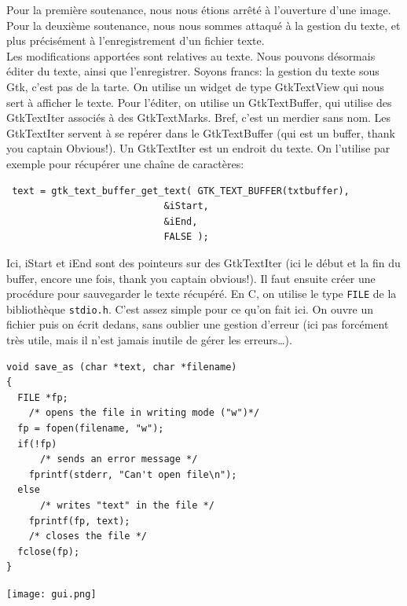 \documentclass[a4paper,12pt]{report}
\begin{document}
Pour la premi\`ere soutenance, nous nous \'etions arr\^et\'e \`a l'ouverture d'une image.\\
Pour la deuxi\`eme soutenance, nous nous sommes attaqu\'e \`a la gestion du texte, et plus pr\'ecis\'ement \`a l'enregistrement d'un fichier texte.\\
Les modifications apport\'ees sont relatives au texte. Nous pouvons d\'esormais \'editer du texte, ainsi que l'enregistrer. Soyons francs: la gestion du texte sous Gtk, c'est pas de la tarte. On utilise un widget de type GtkTextView qui nous sert \`a afficher le texte. Pour l'\'editer, on utilise un GtkTextBuffer, qui utilise des GtkTextIter associ\'es \`a des GtkTextMarks. Bref, c'est un merdier sans nom.
Les GtkTextIter servent \`a se rep\'erer dans le GtkTextBuffer (qui est un buffer, thank you captain Obvious!). Un GtkTextIter est un endroit du texte. On l'utilise par exemple pour r\'ecup\'erer une cha\^ine de caract\`eres:
\begin{lstlisting}
 text = gtk_text_buffer_get_text( GTK_TEXT_BUFFER(txtbuffer),
                            &iStart,
                            &iEnd,
                            FALSE );
\end{lstlisting}
Ici, iStart et iEnd sont des pointeurs sur des GtkTextIter (ici le d\'ebut et la fin du buffer, encore une fois, thank you captain obvious!).
Il faut ensuite cr\'eer une proc\'edure pour sauvegarder le texte r\'ecup\'er\'e. En C, on utilise le type \verb!FILE! de la biblioth\`eque \verb!stdio.h!. C'est assez simple pour ce qu'on fait ici. On ouvre un fichier puis on \'ecrit dedans, sans oublier une gestion d'erreur (ici pas forc\'ement tr\`es utile, mais il n'est jamais inutile de g\'erer les erreurs\ldots).

\begin{lstlisting}
void save_as (char *text, char *filename)
{
  FILE *fp;
    /* opens the file in writing mode ("w")*/
  fp = fopen(filename, "w");
  if(!fp)
      /* sends an error message */
    fprintf(stderr, "Can't open file\n");
  else
      /* writes "text" in the file */
    fprintf(fp, text);
    /* closes the file */
  fclose(fp);
}
\end{lstlisting}

\begin{center}

	\texttt{[image: gui.png]}\\
	\caption{\emph{Notre magnifique interface graphique, telle qu'on l'avait pr\'esent\'ee lors de la deuxi\`eme soutenance}}\\
\end{center}
\end{document}
